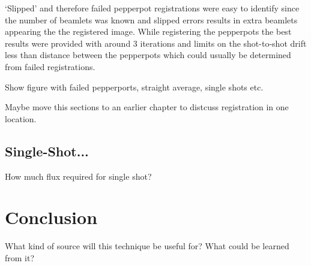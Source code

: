 `Slipped' and therefore failed pepperpot registrations were easy to identify since the number of beamlets was known and slipped errors results in extra beamlets appearing the the registered image.
While registering the pepperpots the best results were provided with around 3 iterations and limits on the shot-to-shot drift less than distance between the pepperpots which could usually be determined from failed registrations.

{\color{red}Show figure with failed pepperports, straight average, single shots etc.

Maybe move this sections to an earlier chapter to distcuss registration in one location.}

\subsection{Single-Shot...}

How much flux required for single shot?

\section{Conclusion}
What kind of source will this technique be useful for?
What could be learned from it?
